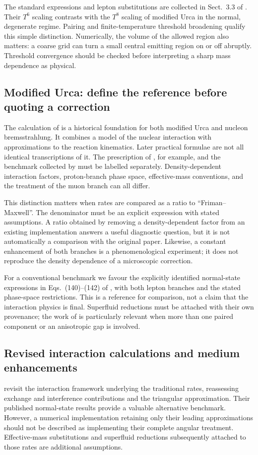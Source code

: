 \documentclass{aa}
\begin{document}
The standard expressions and lepton substitutions are collected in Sect.~3.3 of \citet{Yakovlev2001}. Their $T^6$ scaling contrasts with the $T^8$ scaling of modified Urca in the normal, degenerate regime. Pairing and finite-temperature threshold broadening qualify this simple distinction. Numerically, the volume of the allowed region also matters: a coarse grid can turn a small central emitting region on or off abruptly. Threshold convergence should be checked before interpreting a sharp mass dependence as physical.

\subsection{Modified Urca: define the reference before quoting a correction}
The calculation of \citet{Friman1979} is a historical foundation for both modified Urca and nucleon bremsstrahlung. It combines a model of the nuclear interaction with approximations to the reaction kinematics. Later practical formulae are not all identical transcriptions of it. The prescription of \citet{Yakovlev1995}, for example, and the benchmark collected by \citet{Yakovlev2001} must be labelled separately. Density-dependent interaction factors, proton-branch phase space, effective-mass conventions, and the treatment of the muon branch can all differ.

This distinction matters when rates are compared as a ratio to ``Friman--Maxwell''. The denominator must be an explicit expression with stated assumptions. A ratio obtained by removing a density-dependent factor from an existing implementation answers a useful diagnostic question, but it is not automatically a comparison with the original paper. Likewise, a constant enhancement of both branches is a phenomenological experiment; it does not reproduce the density dependence of a microscopic correction.

For a conventional benchmark we favour the explicitly identified normal-state expressions in Eqs.~(140)--(142) of \citet{Yakovlev2001}, with both lepton branches and the stated phase-space restrictions. This is a reference for comparison, not a claim that the interaction physics is final. Superfluid reductions must be attached with their own provenance; the work of \citet{Gusakov2002} is particularly relevant when more than one paired component or an anisotropic gap is involved.

\subsection{Revised interaction calculations and medium enhancements}
\citet{Bottaro2024} revisit the interaction framework underlying the traditional rates, reassessing exchange and interference contributions and the triangular approximation. Their published normal-state results provide a valuable alternative benchmark. However, a numerical implementation retaining only their leading approximations should not be described as implementing their complete angular treatment. Effective-mass substitutions and superfluid reductions subsequently attached to those rates are additional assumptions.
\end{document}
